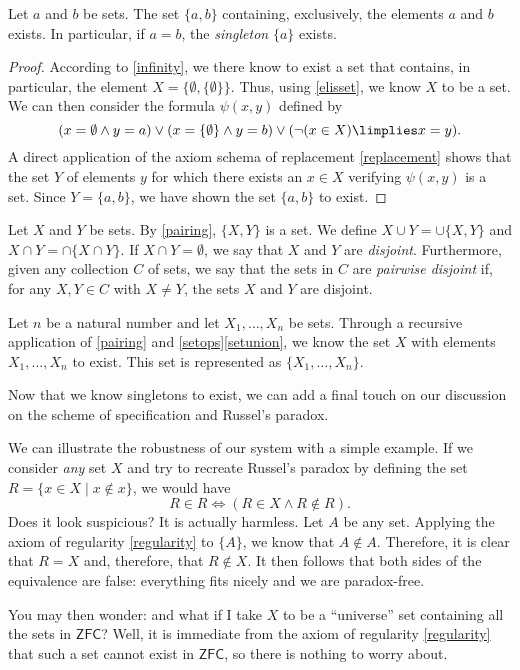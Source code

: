 \begin{proposition}[Pairing]
Let $a$ and $b$ be sets. The set $\{a,b\}$ containing, exclusively, the elements $a$ and $b$ exists. In particular, if $a=b$, the \emph{singleton} $\{a\}$ exists.
\label{pairing}
\end{proposition}

\begin{proof}
According to \ref{infinity}, we there know to exist a set that contains, in particular, the element $X = \{\emptyset, \{\emptyset\}\}$. Thus, using \ref{elisset}, we know $X$ to be a set.
We can then consider the formula $\psi(x,y)$ defined by
\[ (x = \emptyset \land y = a) \lor (x = \{\emptyset\} \land y = b) \lor (\lnot (x \in X) \limplies x = y).\]
A direct application of the axiom schema of replacement \ref{replacement} shows that the set $Y$ of elements $y$ for which there exists an $x\in X$ verifying $\psi(x,y)$ is a set. Since $Y = \{a,b\}$, we have shown the set $\{a,b\}$ to exist.
\end{proof}

\begin{para}[Notation]
Let $X$ and $Y$ be sets. By \ref{pairing}, $\{X,Y\}$ is a set. We define $X\cup Y = \cup\{X,Y\}$ and $X\cap Y = \cap \{X\cap Y\}$. 
If $X\cap Y = \emptyset$, we say that $X$ and $Y$ are \emph{disjoint}. Furthermore, given any collection $C$ of sets, we say that the sets in $C$ are \emph{pairwise disjoint} if, for any $X,Y\in C$ with $X\neq Y$, the sets $X$ and $Y$ are disjoint.


Let $n$ be a natural number and let $X_1,\ldots,X_n$ be sets. Through a recursive application of \ref{pairing} and \ref{setops}\ref{setunion}, we know the set $X$ with elements $X_1,\ldots, X_n$ to exist. This set is represented as $\{X_1,\ldots,X_n\}$.
\end{para}

\begin{para}
Now that we know singletons to exist, we can add a final touch on our discussion on the scheme of specification and Russel's paradox.

We can illustrate the robustness of our system with a simple example.
If we consider \emph{any} set $X$ and try to recreate Russel's paradox by defining the set $R = \{x \in X \mid x\not\in x\}$, we would have
\[ R \in R \iff (R \in X \land R \not \in R).\]
Does it look suspicious? It is actually harmless.
Let $A$ be any set. Applying the axiom of regularity \ref{regularity} to $\{A\}$, we know that $A \not\in A$. Therefore, it is clear that $R = X$ and, therefore, that $R\not\in X$.
It then follows that both sides of the equivalence are false: everything fits nicely and we are paradox-free.

You may then wonder: and what if I take $X$ to be a ``universe'' set containing all the sets in $\mathsf{ZFC}$? Well, it is immediate from the axiom of regularity \ref{regularity} that such a set cannot exist in $\mathsf{ZFC}$, so there is nothing to worry about.
\end{para}

